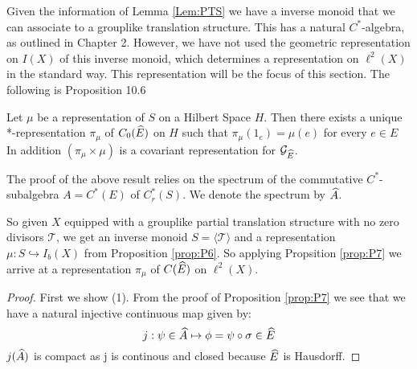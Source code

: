 \begin{corollary}
Given the information of Lemma \ref{Lem:PTS} we have a inverse monoid that we can associate to a grouplike translation structure. This has a natural $C^{*}$-algebra, as outlined in Chapter 2. However, we have not used the geometric representation on $I(X)$ of this inverse monoid, which determines a representation on $\ell^{2}(X)$ in the standard way. This representation will be the focus of this section. The following is Proposition 10.6 \cite{MR2419901}

\begin{proposition}\label{prop:P7} 
Let $\mu$ be a representation of $S$ on a Hilbert Space $H$. Then there exists a unique *-representation $\pi_{\mu}$ of $C_{0}(\widehat{E})$ on $H$ such that $\pi_{\mu}(1_{e})=\mu(e)$ for every $e \in E$ In addition $(\pi_{\mu} \times \mu)$ is a covariant representation for $\mathcal{G}_{\widehat{E}}$. 
\end{proposition}

The proof of the above result relies on the spectrum of the commutative $C^{*}$-subalgebra $A=C^{*}(E)$ of $C^{*}_{r}(S)$. We denote the spectrum by $\widehat{A}$.

So given $X$ equipped with a grouplike partial translation structure with no zero divisors $\mathcal{T}$, we get an inverse monoid $S=\langle \mathcal{T} \rangle$ and a representation $\mu: S \hookrightarrow I_{b}(X)$ from Proposition \ref{prop:P6}. So applying Propsition \ref{prop:P7} we arrive at a representation $\pi_{\mu}$ of $C(\widehat{E})$ on $\ell^{2}(X)$. 

\begin{proof}
First we show (1). From the proof of Proposition \ref{prop:P7} we see that we have a natural injective continuous map given by: 
\begin{equation*}
j: \psi \in \widehat{A} \mapsto \phi = \psi \circ \sigma \in \widehat{E}
\end{equation*}
$j(\widehat{A})$ is compact as j is continous and closed because $\widehat{E}$ is Hausdorff.


\end{proof}
\end{corollary}
